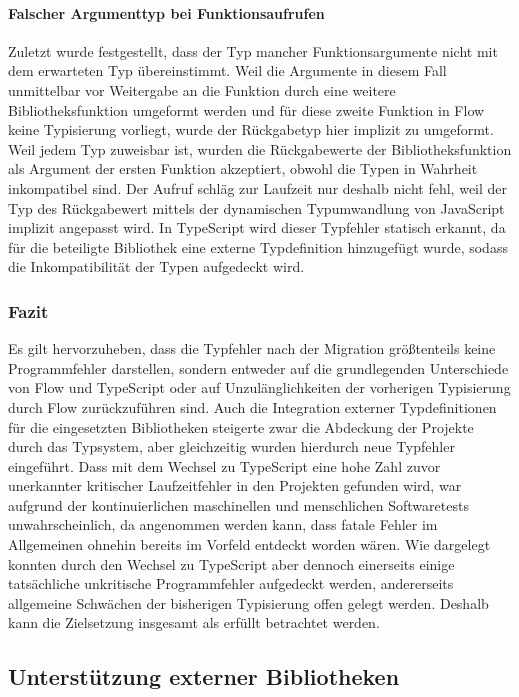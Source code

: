 \vspace{-0.5\baselineskip}
\paragraph{Falscher Argumenttyp bei Funktionsaufrufen}
Zuletzt wurde festgestellt, dass der Typ mancher Funktionsargumente nicht mit dem erwarteten Typ übereinstimmt. Weil die Argumente in diesem Fall unmittelbar vor Weitergabe an die Funktion durch eine weitere Bibliotheksfunktion umgeformt werden und für diese zweite Funktion in Flow keine Typisierung vorliegt, wurde der Rückgabetyp hier implizit zu  umgeformt. Weil  jedem Typ zuweisbar ist, wurden die Rückgabewerte der Bibliotheksfunktion als Argument der ersten Funktion akzeptiert, obwohl die Typen in Wahrheit inkompatibel sind. Der Aufruf schläg zur Laufzeit nur deshalb nicht fehl, weil der Typ des Rückgabewert mittels der dynamischen Typumwandlung von JavaScript implizit angepasst wird. In TypeScript wird dieser Typfehler statisch erkannt, da für die beteiligte Bibliothek eine externe Typdefinition hinzugefügt wurde, sodass die Inkompatibilität der Typen aufgedeckt wird.

\subsubsection{Fazit}

Es gilt hervorzuheben, dass die Typfehler nach der Migration größtenteils keine Programmfehler darstellen, sondern entweder auf die grundlegenden Unterschiede von Flow und TypeScript oder auf Unzulänglichkeiten der vorherigen Typisierung durch Flow zurückzuführen sind. Auch die Integration externer Typdefinitionen für die eingesetzten Bibliotheken steigerte zwar die Abdeckung der Projekte durch das Typsystem, aber gleichzeitig wurden hierdurch neue Typfehler eingeführt. Dass mit dem Wechsel zu TypeScript eine hohe Zahl zuvor unerkannter kritischer Laufzeitfehler in den Projekten gefunden wird, war aufgrund der kontinuierlichen maschinellen und menschlichen Softwaretests unwahrscheinlich, da angenommen werden kann, dass fatale Fehler im Allgemeinen ohnehin bereits im Vorfeld entdeckt worden wären. Wie dargelegt konnten durch den Wechsel zu TypeScript aber dennoch einerseits einige tatsächliche unkritische Programmfehler aufgedeckt werden, andererseits allgemeine Schwächen der bisherigen Typisierung offen gelegt werden. Deshalb kann die Zielsetzung insgesamt als erfüllt betrachtet werden.

\subsection{Unterstützung externer Bibliotheken}

